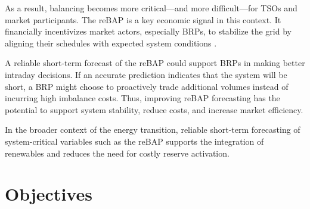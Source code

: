 \documentclass[class=scrbook, crop=false]{standalone}
\begin{document}
As a result, balancing becomes more critical—and more difficult—for \gls{TSO}s and market participants. The \gls{reBAP} is a key economic signal in this context. It financially incentivizes market actors, especially \gls{BRP}s, to stabilize the grid by aligning their schedules with expected system conditions \cite{kochPASSIVEBALANCINGINTRADAY2020a}.

A reliable short-term forecast of the \gls{reBAP} could support \gls{BRP}s in making better intraday decisions. If an accurate prediction indicates that the system will be short, a \gls{BRP} might choose to proactively trade additional volumes instead of incurring high imbalance costs. Thus, improving \gls{reBAP} forecasting has the potential to support system stability, reduce costs, and increase market efficiency.

In the broader context of the energy transition, reliable short-term forecasting of system-critical variables such as the \gls{reBAP} supports the integration of renewables and reduces the need for costly reserve activation.

\section{Objectives}
\label{Section::Objectives}




\end{document}
